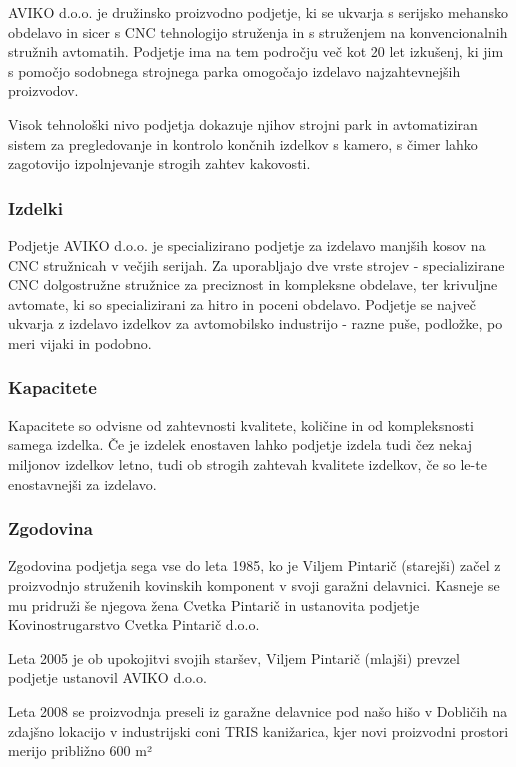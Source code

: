 AVIKO d.o.o. je družinsko proizvodno podjetje,
ki se ukvarja s serijsko mehansko obdelavo in sicer
s CNC tehnologijo struženja in s struženjem na
konvencionalnih stružnih avtomatih.
Podjetje ima na tem področju več kot 20 let izkušenj,
ki jim s pomočjo sodobnega strojnega parka omogočajo
izdelavo najzahtevnejših proizvodov.

Visok tehnološki nivo podjetja dokazuje njihov strojni
park in avtomatiziran sistem za pregledovanje in
kontrolo končnih izdelkov s kamero, s čimer lahko
zagotovijo izpolnjevanje strogih zahtev kakovosti.

\subsubsection{Izdelki}
Podjetje AVIKO d.o.o. je specializirano podjetje za izdelavo manjših
kosov na CNC stružnicah v večjih serijah. Za uporabljajo dve
vrste strojev - specializirane CNC dolgostružne stružnice za preciznost
in kompleksne obdelave, ter krivuljne avtomate, ki so specializirani za
hitro in poceni obdelavo. Podjetje se največ ukvarja z izdelavo izdelkov
za avtomobilsko industrijo - razne puše, podložke, po meri vijaki in podobno.

\subsubsection{Kapacitete}
Kapacitete so odvisne od zahtevnosti kvalitete, količine
in od kompleksnosti samega izdelka. Če je izdelek enostaven
lahko podjetje izdela tudi čez nekaj miljonov izdelkov letno,
tudi ob strogih zahtevah kvalitete izdelkov, če so le-te enostavnejši
za izdelavo.

\subsubsection{Zgodovina}
Zgodovina podjetja sega vse do leta 1985, ko je Viljem Pintarič (starejši)
začel z proizvodnjo struženih kovinskih komponent v svoji garažni delavnici.
Kasneje se mu pridruži še njegova žena Cvetka Pintarič in ustanovita
podjetje Kovinostrugarstvo Cvetka Pintarič d.o.o.

Leta 2005 je ob upokojitvi svojih staršev, Viljem Pintarič (mlajši)
prevzel podjetje ustanovil AVIKO d.o.o.

Leta 2008 se proizvodnja preseli iz garažne delavnice pod našo hišo
v Dobličih na zdajšno lokacijo v industrijski coni TRIS kanižarica,
kjer novi proizvodni prostori merijo približno 600 m²

